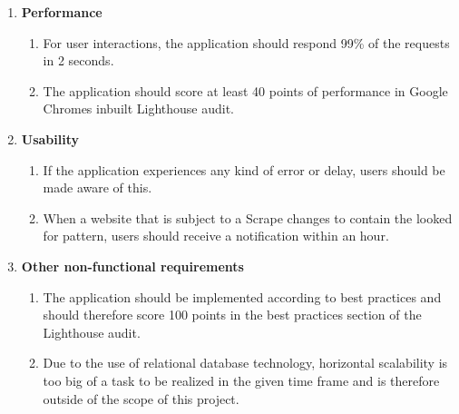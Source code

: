 \documentclass[titlepage, 12pt]{article}
\begin{document}
\begin{enumerate}
  \item \textbf{Performance}
        \begin{enumerate}
          \item For user interactions, the application should respond 99\% of the requests in 2 seconds.
          \item The application should score at least 40 points of performance in Google Chromes inbuilt Lighthouse audit.
        \end{enumerate}
  \item \textbf{Usability}
        \begin{enumerate}
          \item If the application experiences any kind of error or delay, users should be made aware of this.
          \item When a website that is subject to a Scrape changes to contain the looked for pattern, users should receive a notification within an hour.
        \end{enumerate}
  \item \textbf{Other non-functional requirements}
        \begin{enumerate}
          \item The application should be implemented according to best practices and should therefore score 100 points in the best practices section of the Lighthouse audit.
          \item Due to the use of relational database technology, horizontal scalability is too big of a task to be realized in the given time frame and is therefore outside of the scope of this project.
        \end{enumerate}
\end{enumerate}

\pagebreak

\listoftables
\listoffigures

\pagebreak



\end{document}
